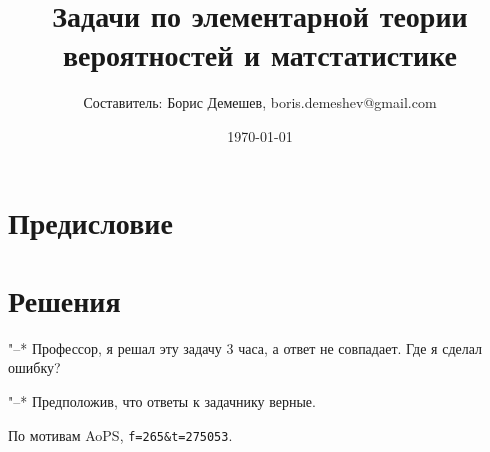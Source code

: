 \documentclass[pdftex,11pt,a4paper]{article}
\title{Задачи по элементарной теории вероятностей и
матстатистике}
\author{Составитель: Борис Демешев, boris.demeshev@gmail.com}
\date{\today}
\begin{document}

\maketitle
\tableofcontents{}

\section*{Предисловие} %

\problemonly





\section{Решения}
\solutiononly

"--* Профессор, я решал эту задачу 3 часа, а ответ не совпадает. Где я сделал ошибку?

"--* Предположив, что ответы к задачнику верные.

По мотивам AoPS, \texttt{f=265\&t=275053}.
\par\bigskip







% 

% 



\end{document}
